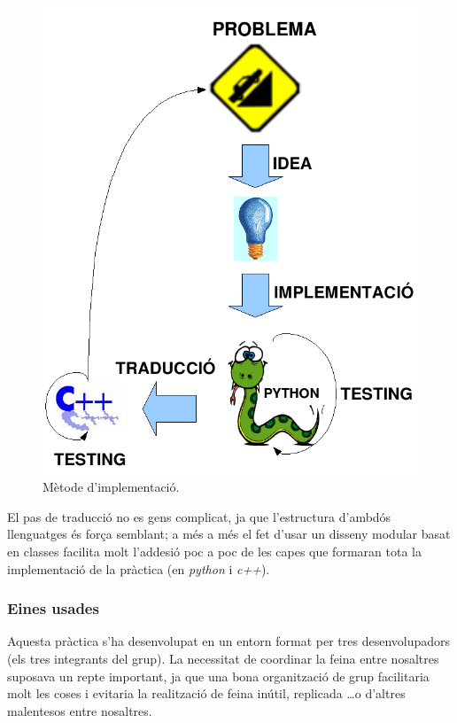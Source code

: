 \documentclass[a4paper,10pt]{article}
\begin{document}
			\begin{figure}[h]
			\begin{center}
			\includegraphics[scale=0.4]{metode.png}
			\caption{Mètode d'implementació.}
			\label{metod}
			\end{center}
			\end{figure}

		El pas de traducció no es gens complicat, ja que l'estructura d'ambdós llenguatges és força semblant; a més a més el fet d'usar un disseny modular basat en classes facilita molt l'addesió poc a poc de les capes que formaran tota la implementació de la pràctica (en \emph{python} i \emph{c++}).

		\subsubsection{Eines usades}
		Aquesta pràctica s'ha desenvolupat en un entorn format per tres desenvolupadors (els tres integrants del grup). La necessitat de coordinar la feina entre nosaltres suposava un repte important, ja que una bona organització de grup facilitaria molt les coses i evitaria la realització de feina inútil, replicada \ldots o d'altres malentesos entre nosaltres.
\end{document}
